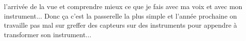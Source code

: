 l'arrivée de la vue et comprendre mieux ce que je fais avec ma voix et avec mon instrument... Donc ça c'est la passerelle la plus simple et l'année prochaine on travaille pas mal sur greffer des capteurs sur des instruments pour appendre à transformer son instrument... 







